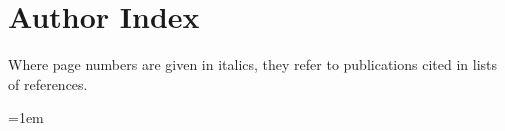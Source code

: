 \clearpage
\section*{Author Index}

\begin{center}
Where page numbers are given in italics, they refer to publications cited in
lists of references.
\end{center}

\ExerciseIndexPaginationNote

\begingroup
\small
\setlength{\columnsep}{2.2em}
\setlength{\parindent}{0pt}
\setlength{\parskip}{0pt}
\emergencystretch=1em
\raggedright
\raggedcolumns

\newcommand{\aidxbib}[1]{\textit{#1}}
\newcommand{\aidxentry}[2]{%
  \par\noindent\hangindent=1.75em\hangafter=1
  \mbox{#1}\nobreakspace #2\par
}
\newcommand{\aidxgroup}{\par\addvspace{0.65\baselineskip}}

\vspace{1.25\baselineskip}


